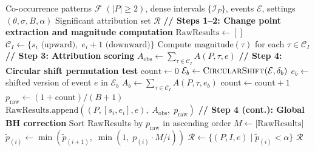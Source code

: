 \begin{algorithm}[!ht]
\caption{Attribution Scoring and Statistical Testing (Steps 1--4)}
\label{alg:scoring}
\begin{algorithmic}[1]
\Require Co-occurrence patterns $\mathcal{F}\;(|P| \geq 2)$, dense intervals $\{{\mathcal{I}_P}\}$, events $\mathcal{E}$, settings $(\theta, \sigma, B, \alpha)$
\Ensure Significant attribution set $\mathcal{R}$
\Statex \textbf{// Steps 1--2: Change point extraction and magnitude computation}
\State $\text{RawResults} \gets []$
    \State $\mathcal{C}_I \gets \{s_i \text{ (upward)},\; e_i{+}1 \text{ (downward)}\}$
    \State Compute $\text{magnitude}(\tau)$ for each $\tau \in \mathcal{C}_I$ 
    \Statex \textbf{// Step 3: Attribution scoring}
        \State $A_{\text{obs}} \gets \sum_{\tau \in \mathcal{C}_I} A(P, \tau, e)$ 
        \Statex \textbf{// Step 4: Circular shift permutation test}
        \State $\text{count} \gets 0$
            \State $\mathcal{E}_b \gets \Call{CircularShift}{\mathcal{E}, \delta_b}$
            \State $e_b \gets$ shifted version of event $e$ in $\mathcal{E}_b$ 
            \State $A_b \gets \sum_{\tau \in \mathcal{C}_I} A(P, \tau, e_b)$
             $\text{count} \gets \text{count} + 1$ \EndIf
        \EndFor
        \State $p_{\text{raw}} \gets (1 + \text{count}) / (B + 1)$ 
        \State $\text{RawResults}.\text{append}((P, [s_i,e_i], e),\; A_{\text{obs}},\; p_{\text{raw}})$
    \EndFor
\EndFor
\Statex \textbf{// Step 4 (cont.): Global BH correction}
\State Sort RawResults by $p_{\text{raw}}$ in ascending order
\State $M \gets |\text{RawResults}|$
    \State $\tilde{p}_{(i)} \gets \min(\tilde{p}_{(i+1)},\; \min(1,\; p_{(i)} \cdot M / i))$ 
\EndFor
\State $\mathcal{R} \gets \{(P, I, e) \mid \tilde{p}_{(i)} < \alpha\}$
\State \Return $\mathcal{R}$
\end{algorithmic}
\end{algorithm}
